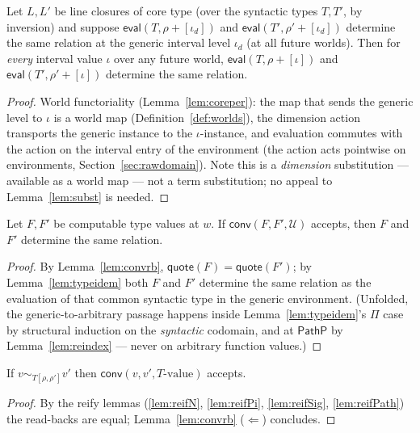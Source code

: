 \documentclass{lmcs}
\newcommand{\U}{\mathcal{U}}
\newcommand{\evalop}{\mathsf{eval}}
\newcommand{\convop}{\mathsf{conv}}
\newcommand{\quo}{\mathsf{quote}}
\begin{document}
\begin{lem}\label{lem:reindex}
  Let $L, L'$ be line closures of core type (over the syntactic
  types $T, T'$, by inversion) and suppose
  $\evalop(T, \rho{+}[\iota_d]) $ and
  $\evalop(T', \rho'{+}[\iota_d])$ determine the same relation at
  the generic interval level $\iota_d$ (at all future worlds).
  Then for \emph{every} interval value $\iota$ over any future
  world, $\evalop(T, \rho{+}[\iota])$ and
  $\evalop(T', \rho'{+}[\iota])$ determine the same relation.
\end{lem}
\begin{proof}
  World functoriality (Lemma~\ref{lem:coreper}): the map that sends
  the generic level to $\iota$ is a world map
  (Definition~\ref{def:worlds}), the dimension action transports
  the generic instance to the $\iota$-instance, and evaluation
  commutes with the action on the interval entry of the environment
  (the action acts pointwise on environments,
  Section~\ref{sec:rawdomain}).  Note this is a \emph{dimension}
  substitution --- available as a world map --- not a term
  substitution; no appeal to Lemma~\ref{lem:subst} is needed.
\end{proof}

\begin{lem}\label{lem:typeconvsound}
  Let $F, F'$ be computable type values at $w$.  If
  $\convop(F, F', \U)$ accepts, then $F$ and $F'$ determine the
  same relation.
\end{lem}
\begin{proof}
  By Lemma~\ref{lem:convrb}, $\quo(F) = \quo(F')$; by
  Lemma~\ref{lem:typeidem} both $F$ and $F'$ determine the same
  relation as the evaluation of that common syntactic type in the
  generic environment.  (Unfolded, the generic-to-arbitrary passage
  happens inside Lemma~\ref{lem:typeidem}'s $\Pi$ case by
  structural induction on the \emph{syntactic} codomain, and at
  $\mathsf{PathP}$ by Lemma~\ref{lem:reindex} --- never on
  arbitrary function values.)
\end{proof}

\begin{lem}\label{lem:coreconvcomp}
  If $v \sim_{T[\rho,\rho']} v'$ then
  $\convop(v, v', T\text{-value})$ accepts.
\end{lem}
\begin{proof}
  By the reify lemmas
  (\ref{lem:reifN}, \ref{lem:reifPi}, \ref{lem:reifSig},
  \ref{lem:reifPath}) the read-backs are equal;
  Lemma~\ref{lem:convrb} ($\Leftarrow$) concludes.
\end{proof}
\end{document}
